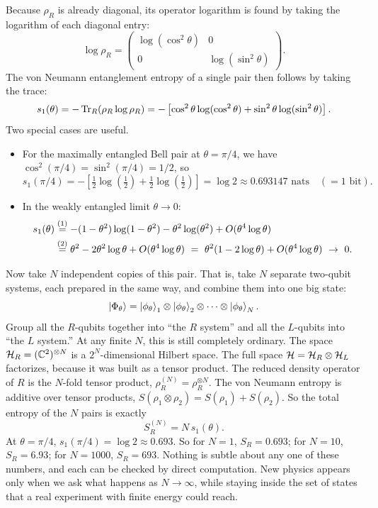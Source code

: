 Because $\rho_R$ is already diagonal, its operator logarithm is found by taking the logarithm of each diagonal
entry:
\[
\log\rho_R = \begin{pmatrix} \log(\cos^2\theta) & 0 \\ 0 & \log(\sin^2\theta) \end{pmatrix} .
\]
The von Neumann entanglement entropy of a single pair then follows by taking the trace:
\[
s_1(\theta) = -\operatorname{Tr}_R(\rho_R\log\rho_R)
= -\left[ \cos^2\theta\log(\cos^2\theta) + \sin^2\theta\log(\sin^2\theta) \right] .
\]
Two special cases are useful.
\begin{itemize}
\item For the maximally entangled Bell pair at $\theta=\pi/4$, we have $\cos^2(\pi/4)=\sin^2(\pi/4)=1/2$,
so
\[
s_1(\pi/4) = -\left[ \tfrac12\log(\tfrac12) + \tfrac12\log(\tfrac12) \right]
= \log 2 \approx 0.693147\text{ nats} \quad (= 1\text{ bit}).
\]
\item In the weakly entangled limit $\theta \to 0$:
\begin{align}
s_1(\theta) &\overset{(1)}{=} -(1-\theta^2)\log(1-\theta^2) - \theta^2\log(\theta^2) + O(\theta^4\log\theta) \notag\\
&\overset{(2)}{=} \theta^2 - 2\theta^2\log\theta + O(\theta^4\log\theta)
\ =\ \theta^2(1 - 2\log\theta) + O(\theta^4\log\theta) \ \to\ 0 . \notag
\end{align}
\quad
{}
\end{itemize}

Now take $N$ independent copies of this pair. That is, take $N$ separate two-qubit systems, each prepared in
the same way, and combine them into one big state:
\[
\ket{\Phi_\theta} = \ket{\phi_\theta}_1\otimes\ket{\phi_\theta}_2\otimes\cdots\otimes\ket{\phi_\theta}_N .
\]
Group all the $R$-qubits together into ``the $R$ system'' and all the $L$-qubits into ``the $L$ system.'' At
any finite $N$, this is still completely ordinary. The space $\mathcal{H}_R=(\mathbb C^2)^{\otimes N}$ is a
$2^N$-dimensional Hilbert space. The full space $\mathcal{H}=\mathcal{H}_R\otimes\mathcal{H}_L$ factorizes, because it was built as a
tensor product. The reduced density operator of $R$ is the $N$-fold tensor product,
$\rho_R^{(N)} = \rho_R^{\otimes N}$. The von Neumann entropy is additive over tensor products,
$S(\rho_1 \otimes \rho_2) = S(\rho_1) + S(\rho_2)$. So the total entropy of the $N$ pairs is exactly
\[
S_R^{(N)} = N\, s_1(\theta) .
\]
At $\theta=\pi/4$, $s_1(\pi/4)=\log2\approx0.693$. So for $N=1$, $S_R=0.693$; for $N=10$, $S_R=6.93$; for
$N=1000$, $S_R=693$. Nothing is subtle about any one of these numbers, and each can be checked by direct
computation. New physics appears only when we ask what happens as $N\to\infty$, while staying
inside the set of states that a real experiment with finite energy could reach.

